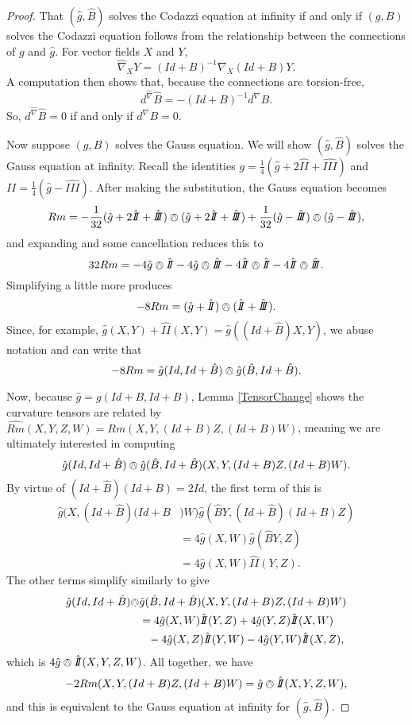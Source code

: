 \documentclass{amsart}
\newcommand{\two}{I\!\!I}
\newcommand{\three}{I\!\!I\!\!I}
\begin{document}
\begin{proof}
That $(\hat{g},\hat{B})$ solves the Codazzi equation at infinity if and only if $(g,B)$ solves the Codazzi equation follows from the relationship between the connections of $g$ and $\hat{g}$. 
For vector fields $X$ and $Y$,
\[
\widehat{\nabla}_XY = (Id+B)^{-1}\nabla_X(Id+B)Y.
\]
A computation then shows that, because the connections are torsion-free,
\[
d^{\widehat{\nabla}}\hat{B} = -(Id+B)^{-1}d^\nabla B.
\]
So, $d^{\widehat{\nabla}}\hat{B} = 0$ if and only if $d^\nabla B = 0$.

Now suppose $(g,B)$ solves the Gauss equation. 
We will show $(\hat{g},\hat{B})$ solves the Gauss equation at infinity. 
Recall the identities $g = \frac{1}{4}(\hat{g} + 2 \hat{\two} + \hat{\three})$ and $\two = \frac{1}{4}(\hat{g} - \hat{\three})$.
After making the substitution, the Gauss equation becomes 
\[
Rm = -\frac{1}{32}(\hat{g} + 2 \hat{\two} + \hat{\three})\owedge(\hat{g} + 2 \hat{\two} + \hat{\three}) + \frac{1}{32}(\hat{g} - \hat{\three})\owedge(\hat{g} - \hat{\three}),
\]
and expanding and some cancellation reduces this to
\[
32Rm = -4\hat{g}\owedge \hat{\two} -4 \hat{g} \owedge \hat{\three} - 4 \hat{\two}\owedge\hat{\two} - 4 \hat{\two}\owedge\hat{\three}.
\] 
Simplifying a little more produces
\[
-8Rm = (\hat{g} + \hat{\two})\owedge (\hat{\two} + \hat{\three}).
\]
Since, for example, $\hat{g}(X,Y) + \hat{\two}(X,Y) = \hat{g}((Id + \hat{B})X,Y)$, we abuse notation and can write that
\[
-8Rm = \hat{g}(Id, Id + \hat{B})\owedge \hat{g}(\hat{B}, Id + \hat{B}).
\]

Now, because $\hat{g} = g(Id + B, Id + B)$, Lemma \ref{TensorChange} shows the curvature tensors are related by $\widehat{Rm}(X,Y,Z,W) = Rm(X,Y,(Id+B)Z,(Id+B)W)$, meaning we are ultimately interested in computing
\[
\hat{g}(Id, Id + \hat{B})\owedge \hat{g}(\hat{B}, Id + \hat{B})(X,Y,(Id+B)Z,(Id+B)W).
\]
By virtue of $(Id + \hat{B})(Id+B) = 2 Id$, the first term of this is 
\begin{align*}
\hat{g}(X,(Id + \hat{B})(Id+B&)W)\hat{g}(\hat{B}Y,(Id + \hat{B})(Id+B)Z) \\
&= 4\hat{g}(X,W)\hat{g}(\hat{B}Y,Z) \\
&= 4 \hat{g}(X,W)\hat{\two}(Y,Z).
\end{align*}
The other terms simplify similarly to give
\begin{align*}
\hat{g}(Id, Id + \hat{B})\owedge &\hat{g}(\hat{B}, Id + \hat{B})(X,Y,(Id+B)Z,(Id+B)W) \\
&= 4 \hat{g}(X,W)\hat{\two}(Y,Z) + 4 \hat{g}(Y,Z)\hat{\two}(X,W) \\
&\phantom{=} -4 \hat{g}(X,Z)\hat{\two}(Y,W) - 4 \hat{g}(Y,W)\hat{\two}(X,Z),
\end{align*}
which is $4\hat{g}\owedge\hat{\two}(X,Y,Z,W)$.
All together, we have
\[
-2Rm(X,Y,(Id+B)Z,(Id+B)W) = \hat{g}\owedge\hat{\two}(X,Y,Z,W),
\]
and this is equivalent to the Gauss equation at infinity for $(\hat{g},\hat{B})$.


\end{proof}
\end{document}
